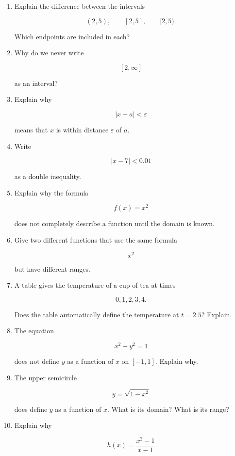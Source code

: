 \begin{enumerate}
\item Explain the difference between the intervals

\[
(2,5),\qquad [2,5],\qquad [2,5).
\]

Which endpoints are included in each?

\item Why do we never write

\[
[2,\infty]
\]

as an interval?

\item Explain why

\[
|x-a|<\varepsilon
\]

means that \(x\) is within distance \(\varepsilon\) of \(a\).

\item Write

\[
|x-7|<0.01
\]

as a double inequality.

\item Explain why the formula

\[
f(x)=x^2
\]

does not completely describe a function until the domain is known.

\item Give two different functions that use the same formula

\[
x^2
\]

but have different ranges.

\item A table gives the temperature of a cup of tea at times

\[
0,1,2,3,4.
\]

Does the table automatically define the temperature at \(t=2.5\)? Explain.

\item The equation

\[
x^2+y^2=1
\]

does not define \(y\) as a function of \(x\) on \([-1,1]\). Explain why.

\item The upper semicircle

\[
y=\sqrt{1-x^2}
\]

does define \(y\) as a function of \(x\). What is its domain? What is its range?

\item Explain why

\[
h(x)=\frac{x^2-1}{x-1}
\]


\end{enumerate}
